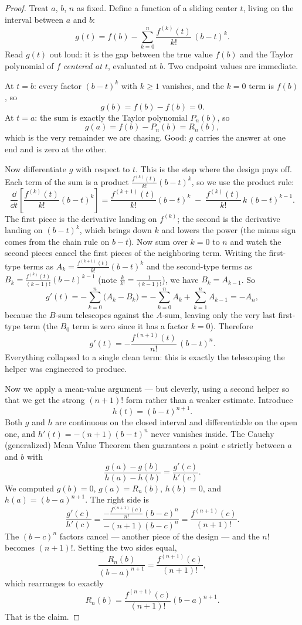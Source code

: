 \begin{proof}
Treat $a$, $b$, $n$ as fixed. Define a function of a sliding center $t$, living on
the interval between $a$ and $b$:
\[
  g(t) = f(b) - \sum_{k=0}^{n} \frac{f^{(k)}(t)}{k!}\,(b-t)^k.
\]
Read $g(t)$ out loud: it is the gap between the true value $f(b)$ and the Taylor
polynomial of $f$ \emph{centered at $t$}, evaluated at $b$. Two endpoint values are
immediate.

At $t = b$: every factor $(b-t)^k$ with $k \ge 1$ vanishes, and the $k=0$ term is
$f(b)$, so
\[
  g(b) = f(b) - f(b) = 0.
\]
At $t = a$: the sum is exactly the Taylor polynomial $P_n(b)$, so
\[
  g(a) = f(b) - P_n(b) = R_n(b),
\]
which is the very remainder we are chasing. Good: $g$ carries the answer at one end
and is zero at the other.

Now differentiate $g$ with respect to $t$. This is the step where the design pays
off. Each term of the sum is a product $\frac{f^{(k)}(t)}{k!}(b-t)^k$, so we use the
product rule:
\[
  \frac{\dd}{\dd t}\!\left[\frac{f^{(k)}(t)}{k!}(b-t)^k\right]
  = \frac{f^{(k+1)}(t)}{k!}(b-t)^k
    \;-\; \frac{f^{(k)}(t)}{k!}\,k\,(b-t)^{k-1}.
\]
The first piece is the derivative landing on $f^{(k)}$; the second is the derivative
landing on $(b-t)^k$, which brings down $k$ and lowers the power (the minus sign
comes from the chain rule on $b-t$). Now sum over $k = 0$ to $n$ and watch the
second pieces cancel the first pieces of the neighboring term. Writing the first-type
terms as $A_k = \frac{f^{(k+1)}(t)}{k!}(b-t)^k$ and the second-type terms as
$B_k = \frac{f^{(k)}(t)}{(k-1)!}(b-t)^{k-1}$ (note $\frac{k}{k!} = \frac{1}{(k-1)!}$),
we have $B_k = A_{k-1}$. So
\[
  g'(t) = -\sum_{k=0}^{n}\big(A_k - B_k\big)
        = -\sum_{k=0}^{n} A_k + \sum_{k=1}^{n} A_{k-1}
        = -A_n,
\]
because the $B$-sum telescopes against the $A$-sum, leaving only the very last
first-type term (the $B_0$ term is zero since it has a factor $k=0$). Therefore
\[
  g'(t) = -\frac{f^{(n+1)}(t)}{n!}\,(b-t)^n.
\]
Everything collapsed to a single clean term: this is exactly the telescoping the
helper was engineered to produce.

Now we apply a mean-value argument --- but cleverly, using a second helper so that we
get the strong $(n+1)!$ form rather than a weaker estimate. Introduce
\[
  h(t) = (b-t)^{n+1}.
\]
Both $g$ and $h$ are continuous on the closed interval and differentiable on the open
one, and $h'(t) = -(n+1)(b-t)^n$ never vanishes inside. The Cauchy (generalized) Mean
Value Theorem then guarantees a point $c$ strictly between $a$ and $b$ with
\[
  \frac{g(a) - g(b)}{h(a) - h(b)} = \frac{g'(c)}{h'(c)}.
\]
We computed $g(b) = 0$, $g(a) = R_n(b)$, $h(b) = 0$, and $h(a) = (b-a)^{n+1}$. The
right side is
\[
  \frac{g'(c)}{h'(c)}
  = \frac{-\frac{f^{(n+1)}(c)}{n!}(b-c)^n}{-(n+1)(b-c)^n}
  = \frac{f^{(n+1)}(c)}{(n+1)!}.
\]
The $(b-c)^n$ factors cancel --- another piece of the design --- and the $n!$ becomes
$(n+1)!$. Setting the two sides equal,
\[
  \frac{R_n(b)}{(b-a)^{n+1}} = \frac{f^{(n+1)}(c)}{(n+1)!},
\]
which rearranges to exactly
\[
  R_n(b) = \frac{f^{(n+1)}(c)}{(n+1)!}(b-a)^{n+1}.
\]
That is the claim.
\end{proof}

